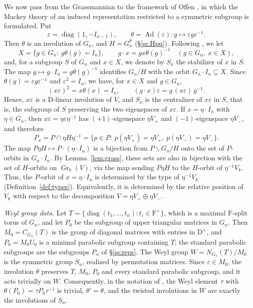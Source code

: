 \documentclass[11pt]{amsart}
\numberwithin{equation}{section}
\theoremstyle{plain}
\theoremstyle{definition}
\theoremstyle{remark}
\DeclareMathOperator{\Gr}{Gr}
\DeclareMathOperator{\diag}{diag}
\DeclareMathOperator{\Ad}{Ad}
\begin{document}
We now pass from the Grassmannian to the framework of Offen \cite{Off17}, in which the Mackey theory of an induced representation restricted to a symmetric subgroup is formulated. Put
$$
\varepsilon=\diag(1,-I_{n-1}),\qquad\theta=\Ad(\varepsilon)\colon g\mapsto\varepsilon g\varepsilon^{-1}.
$$
Then $\theta$ is an involution of $G_n$, and $H=G_n^\theta$ (\S\ref{ss:Hpq}). Following \cite[\S2.1]{Off17}, we let
$$
X=\{g\in G_n:\ g\theta(g)=I_n\},\qquad g\cdot x=gx\theta(g)^{-1}\quad(g\in G_n,\ x\in X),
$$
and, for a subgroup $S$ of $G_n$ and $x\in X$, we denote by $S_x$ the stabilizer of $x$ in $S$. The map $g\mapsto g\cdot I_n=g\theta(g)^{-1}$ identifies $G_n/H$ with the orbit $G_n\cdot I_n\subseteq X$. Since $\theta(g)=\varepsilon g\varepsilon^{-1}$ and $\varepsilon^2=I_n$, we have, for $x\in X$ and $g\in G_n$,
\begin{equation}\label{eq:x-epsilon}
	(x\varepsilon)^2=x\theta(x)=I_n,\qquad (g\cdot x)\varepsilon=g\,(x\varepsilon)\,g^{-1}.
\end{equation}
Hence, $x\varepsilon$ is a $\mathrm{D}$-linear involution of $V$, and $S_x$ is the centralizer of $x\varepsilon$ in $S$, that is, the subgroup of $S$ preserving the two eigenspaces of $x\varepsilon$. If $x=\eta\cdot I_n$ with $\eta\in G_n$, then $x\varepsilon=\eta\varepsilon\eta^{-1}$ has $(+1)$-eigenspace $\eta V_+$ and $(-1)$-eigenspace $\eta V_-$, and therefore
\begin{equation}\label{eq:Px}
	P_x=P\cap\eta H\eta^{-1}=\{p\in P:\ p(\eta V_+)=\eta V_+,\ p(\eta V_-)=\eta V_-\}.
\end{equation}
The map $P\eta H\mapsto P\cdot(\eta\cdot I_n)$ is a bijection from $P\backslash G_n/H$ onto the set of $P$-orbits in $G_n\cdot I_n$. By Lemma~\ref{lem:grass}, these sets are also in bijection with the set of $H$-orbits on $\Gr_k(V)$, via the map sending $P\eta H$ to the $H$-orbit of $\eta^{-1}V_k$. Thus, the $P$-orbit of $x=\eta\cdot I_n$ is determined by the type of $\eta^{-1}V_k$ (Definition~\ref{def:types}). Equivalently, it is determined by the relative position of $V_k$ with respect to the decomposition $V=\eta V_+\oplus\eta V_-$.

\smallskip
\emph{Weyl group data.} Let $T=\{\diag(t_1,\dots,t_n):t_i\in \mathrm{F}^\times\}$, which is a maximal $\mathrm{F}$-split torus of $G_n$, and let $P_0$ be the subgroup of upper triangular matrices in $G_n$. Then $M_0=C_{G_n}(T)$ is the group of diagonal matrices with entries in $\mathrm{D}^\times$, and $P_0=M_0U_0$ is a minimal parabolic subgroup containing $T$; the standard parabolic subgroups are the subgroups $P_\alpha$ of \S\ref{ss:reps}. The Weyl group $W=N_{G_n}(T)/M_0$ is the symmetric group $S_n$, realized by permutation matrices. Since $\varepsilon\in M_0$, the involution $\theta$ preserves $T$, $M_0$, $P_0$ and every standard parabolic subgroup, and it acts trivially on $W$. Consequently, in the notation of \cite[\S\S2.3--3]{Off17}, the Weyl element $\tau$ with $\theta(P_0)=\tau P_0\tau^{-1}$ is trivial, $\theta'=\theta$, and the twisted involutions in $W$ are exactly the involutions of $S_n$.
\end{document}
